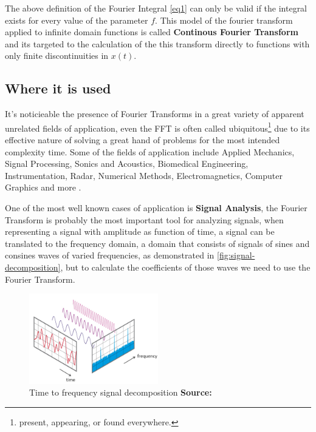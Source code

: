 \documentclass[
  oneside,
  11pt, a4paper,
  footinclude=true,
  headinclude=true,
  cleardoublepage=empty
]{scrbook}
\newcommand*{\source}[1]{%
    \textbf{Source:} \cite{#1}%
}
\begin{document}


The above definition of the Fourier Integral \autoref{eq1} can only be valid if the integral exists for every value of the parameter \(f\). This model of the fourier transform applied to infinite domain functions is called \textbf{Continous Fourier Transform} and its targeted to the calculation of the this transform directly to functions with only finite discontinuities in \( x(t) \).

\subsection{Where it is used} \label{subsec:where-it-is-used}

It's noticieable the presence of Fourier Transforms in a great variety of apparent unrelated fields of application, even the FFT is often called ubiquitous\footnote{present, appearing, or found everywhere.} due to its effective nature of solving a great hand of problems for the most intended complexity time. Some of the fields of application include Applied Mechanics, Signal Processing, Sonics and Acoustics, Biomedical Engineering, Instrumentation, Radar, Numerical Methods, Electromagnetics, Computer Graphics and more \cite{brigham1988fast}. %

One of the most well known cases of application is \textbf{Signal Analysis}, the Fourier Transform is probably the most important tool for analyzing signals, when representing a signal with amplitude as function of time, a signal can be translated to the frequency domain, a domain that consists of signals of sines and consines waves of varied frequencies, as demonstrated in \autoref{fig:signal-decomposition}, but to calculate the coefficients of those waves we need to use the Fourier Transform.

\begin{figure}[h] 
    \label{fig:signal-decomposition}
    \centering
    \includegraphics[width=0.5\textwidth]{imgs/fft_time_freq.png}
    \caption{Time to frequency signal decomposition \source{fftntiaudio}}
\end{figure}
\end{document}
